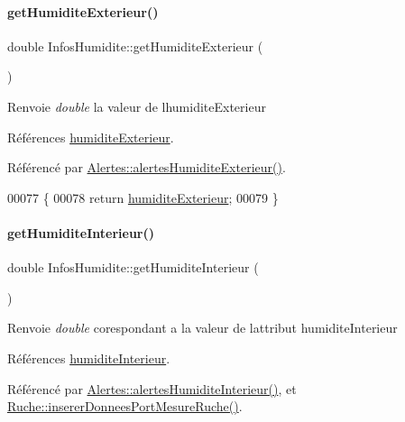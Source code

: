 \paragraph{\texorpdfstring{get\+Humidite\+Exterieur()}{getHumiditeExterieur()}}
{\footnotesize\ttfamily double Infos\+Humidite\+::get\+Humidite\+Exterieur (\begin{DoxyParamCaption}{ }\end{DoxyParamCaption})}

\begin{DoxyReturn}{Renvoie}
{\itshape double} la valeur de l\textquotesingle{}humidite\+Exterieur 
\end{DoxyReturn}


Références \hyperlink{class_infos_humidite_a503a9c849508928d3046292f17f37230}{humidite\+Exterieur}.



Référencé par \hyperlink{class_alertes_a8606946eaa04dfd29bb7951b2b850a04}{Alertes\+::alertes\+Humidite\+Exterieur()}.


\begin{DoxyCode}
00077 \{
00078     \textcolor{keywordflow}{return} \hyperlink{class_infos_humidite_a503a9c849508928d3046292f17f37230}{humiditeExterieur};
00079 \}
\end{DoxyCode}
\mbox{\label{class_infos_humidite_a652f7ca3e4b97352034fed62c6d865b7}} 
\paragraph{\texorpdfstring{get\+Humidite\+Interieur()}{getHumiditeInterieur()}}
{\footnotesize\ttfamily double Infos\+Humidite\+::get\+Humidite\+Interieur (\begin{DoxyParamCaption}{ }\end{DoxyParamCaption})}

\begin{DoxyReturn}{Renvoie}
{\itshape double} corespondant a la valeur de l\textquotesingle{}attribut humidite\+Interieur 
\end{DoxyReturn}


Références \hyperlink{class_infos_humidite_ad2847e671ad0b90f8dc0940dee107c38}{humidite\+Interieur}.



Référencé par \hyperlink{class_alertes_a7558cb097dc392547ceb12ab4d6cbd4c}{Alertes\+::alertes\+Humidite\+Interieur()}, et \hyperlink{class_ruche_aa61f6dd8b15e5242ef3a3bdd87cca4a3}{Ruche\+::inserer\+Donnees\+Port\+Mesure\+Ruche()}.


